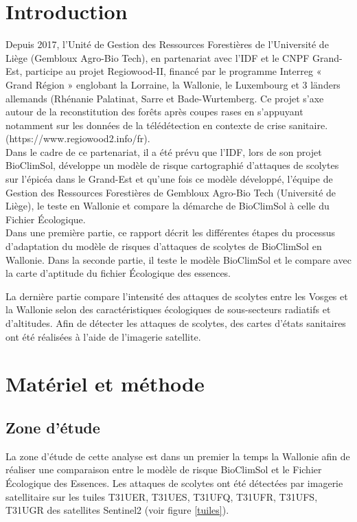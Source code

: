  \section{Introduction}

Depuis 2017, l’Unité de Gestion des Ressources Forestières de l’Université de Liège (Gembloux Agro-Bio Tech), en partenariat avec l’IDF et le CNPF Grand-Est, participe au projet Regiowood-II, financé par le programme Interreg « Grand Région » englobant la Lorraine, la Wallonie, le Luxembourg et 3 länders allemands (Rhénanie Palatinat, Sarre et Bade-Wurtemberg. 
Ce projet s’axe autour de la reconstitution des forêts après coupes rases en s’appuyant notamment sur les données de la télédétection en contexte de crise sanitaire. (https://www.regiowood2.info/fr).\\
Dans le cadre de ce partenariat, il a été prévu que l’IDF, lors de son projet BioClimSol, développe un modèle de risque cartographié d’attaques de scolytes sur l’épicéa dans le Grand-Est et qu'une fois ce modèle développé, l’équipe de Gestion des Ressources Forestières de  Gembloux Agro-Bio Tech (Université de Liège), le teste en Wallonie et compare la démarche de BioClimSol à celle du Fichier Écologique.\\
Dans une première partie, ce rapport décrit les différentes étapes du processus d'adaptation du modèle de risques d’attaques de scolytes de BioClimSol en Wallonie.
Dans la seconde partie, il  teste le modèle BioClimSol et le compare avec la carte d'aptitude du fichier Écologique des essences.

La dernière partie compare l'intensité des attaques de scolytes entre les Vosges et la Wallonie selon des caractéristiques écologiques de sous-secteurs radiatifs et d'altitudes. Afin de détecter les attaques de scolytes, des cartes d'états sanitaires ont été réalisées à l'aide de l'imagerie satellite.

\newpage

 \section{Matériel et méthode}
 
 \subsection{Zone d'étude}
 
La zone d'étude de cette analyse est dans un premier la temps la Wallonie afin de réaliser une comparaison entre le modèle de risque BioClimSol et le Fichier Écologique des Essences. Les attaques de scolytes ont été détectées par imagerie satellitaire sur les tuiles T31UER, T31UES, T31UFQ, T31UFR, T31UFS, T31UGR des satellites Sentinel2 (voir figure \ref{tuiles}).



